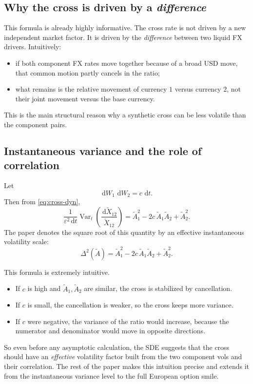 \documentclass[11pt]{article}
\newcommand{\dd}{\,\mathrm{d}}
\newcommand{\eps}{\varepsilon}
\newcommand{\X}{\widetilde{X}}
\newcommand{\Vol}{\widetilde{A}}
\begin{document}
\subsection*{Why the cross is driven by a \emph{difference}}

This formula is already highly informative. The cross rate is not driven by a new independent market factor. It is driven by the \emph{difference} between two liquid FX drivers. Intuitively:
\begin{itemize}
    \item if both component FX rates move together because of a broad USD move, that common motion partly cancels in the ratio;
    \item what remains is the relative movement of currency \(1\) versus currency \(2\), not their joint movement versus the base currency.
\end{itemize}

This is the main structural reason why a synthetic cross can be less volatile than the component pairs.

\subsection*{Instantaneous variance and the role of correlation}

Let
\[
\dd W_1\,\dd W_2 = c\,\dd t.
\]
Then from \eqref{eq:cross-dyn},
\[
\frac{1}{\eps^2\dd t}\operatorname{Var}_t\!\left(\frac{\dd \X_{12}}{\X_{12}}\right)
= \Vol_1^2 -2c\,\Vol_1\Vol_2+\Vol_2^2.
\]
The paper denotes the square root of this quantity by an effective instantaneous volatility scale:
\[
\Delta^2(\Vol)=\Vol_1^2-2c\,\Vol_1\Vol_2+\Vol_2^2.
\]

This formula is extremely intuitive.
\begin{itemize}
    \item If \(c\) is high and \(\Vol_1,\Vol_2\) are similar, the cross is stabilized by cancellation.
    \item If \(c\) is small, the cancellation is weaker, so the cross keeps more variance.
    \item If \(c\) were negative, the variance of the ratio would increase, because the numerator and denominator would move in opposite directions.
\end{itemize}

So even before any asymptotic calculation, the SDE suggests that the cross should have an \emph{effective} volatility factor built from the two component vols and their correlation. The rest of the paper makes this intuition precise and extends it from the instantaneous variance level to the full European option smile.
\end{document}
